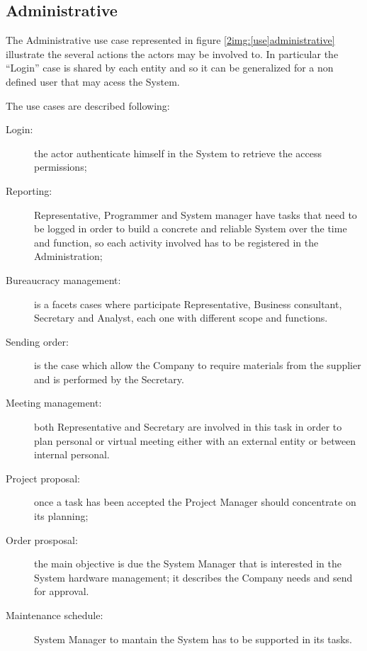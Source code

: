 \subsection{Administrative}
The Administrative use case represented in figure \ref{2img:[use]administrative} illustrate the several actions the actors may be involved to. In particular the ``Login'' case is shared by each entity and so it can be generalized for a non defined user that may acess the System.

The use cases are described following:
\begin{description}
\item[Login:] the actor authenticate himself in the System to retrieve the access permissions;
\item[Reporting:] Representative, Programmer and System manager have tasks that need to be logged in order to build a concrete and reliable System over the time and function, so each activity involved has to be registered in the Administration;
\item[Bureaucracy management:] is a facets cases where participate Representative, Business consultant, Secretary and Analyst, each one with different scope and functions.
\item[Sending order:] is the case which allow the Company to require materials from the supplier and is performed by the Secretary.
\item[Meeting management:] both Representative and Secretary are involved in this task in order to plan personal or virtual meeting either with an external entity or between internal personal.
\item[Project proposal:] once a task has been accepted the Project Manager should concentrate on its planning;
\item[Order prosposal:] the main objective is due the System Manager that is interested in the System hardware management; it describes the Company needs and send for approval.
\item[Maintenance schedule:] System Manager to mantain the System has to be supported in its tasks.
\end{description}


